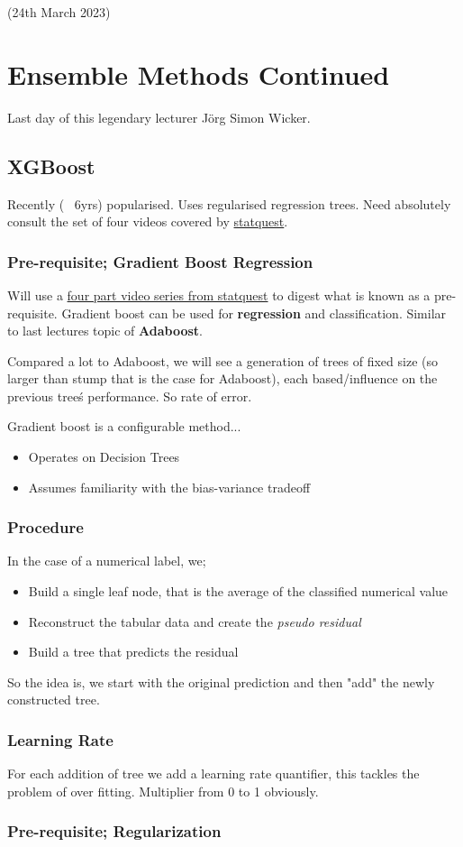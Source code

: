 \documentclass{article}
\begin{document}
(24th March 2023)
\section*{Ensemble Methods Continued}
Last day of this legendary lecturer Jörg Simon Wicker.

\subsection*{XGBoost}
Recently (~ 6yrs) popularised. Uses regularised regression trees. Need absolutely consult the set of four videos covered by \href{https://www.youtube.com/watch?v=OtD8wVaFm6E}{statquest}.

\subsubsection*{Pre-requisite; Gradient Boost Regression}
Will use a \href{https://www.youtube.com/watch?v=3CC4N4z3GJc}{four part video series from statquest} to digest what is known as a pre-requisite. Gradient boost can be used for {\bf regression} and classification. Similar to last lectures topic of {\bf Adaboost}.

Compared a lot to Adaboost, we will see a generation of trees of fixed size (so larger than stump that is the case for Adaboost), each based/influence on the previous tree\'s performance. So rate of error.

Gradient boost is a configurable method...

\begin{itemize}
	\item Operates on Decision Trees
	\item Assumes familiarity with the bias-variance tradeoff
\end{itemize}

\subsubsection*{Procedure}
In the case of a numerical label, we;

\begin{itemize}
	\item Build a single leaf node, that is the average of the classified numerical value
	\item Reconstruct the tabular data and create the {\em pseudo residual}
	\item Build a tree that predicts the residual
\end{itemize}

So the idea is, we start with the original prediction and then "add" the newly constructed tree.

\subsubsection*{Learning Rate}
For each addition of tree we add a learning rate quantifier, this tackles the problem of over fitting. Multiplier from 0 to 1 obviously.


\subsubsection*{Pre-requisite; Regularization}
\end{document}
